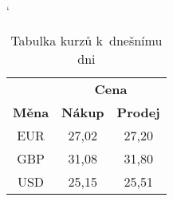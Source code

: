 \documentclass[a4paper, 11pt]{article}
\begin{document}
\begin{table}[h]
\begin{center}
\catcode` %
\begin{tabular}{|c|c|c|} \hline 
	& \multicolumn{2}{|c|}{\textbf{Cena}}\\ \cline{2-3}
	\textbf{Měna} & \textbf{Nákup} & \textbf{Prodej}\\ \hline
EUR & 27,02 & 27,20 \\
GBP & 31,08 & 31,80 \\
USD & 25,15 & 25,51 \\ \hline
\end{tabular}
\caption{Tabulka kurzů k~dnešnímu dni}
\label{kurzy}
\end{center}
\end{table}
\end{document}
